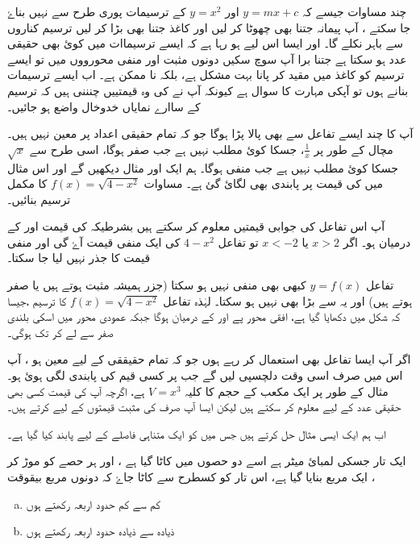 چند مساوات جیسے کہ \( y=mx+c\) اور \(y=x^{2}\) کے ترسیمات پوری طرح سے نہیں بناۓ جا سکتے ، آپ پیمانہ جتنا بھی چھوٹا کر لیں اور کاغذ جتنا بھی بڑا کر لیں ترسیم کناروں سے باہر نکلے گا۔ اور ایسا اس لیے ہو رہا ہے کہ ایسے ترسیماات میں  کوئ بھی حقیقی عدد ہو سکتا ہے جتنا برا آپ سوچ سکیں دونوں مثبت اور منفی محورووں میں تو ایسے ترسیم کو کاغذ میں مقید کر پانا بہت مشکل ہے، بلکہ نا ممکن ہے۔ اب ایسے ترسیمات بنانے ہوں تو آپکی مہارت کا سوال ہے کیونکہ آپ نے  کی وہ قیمتییں چنننی ہیں کہ ترسیم کے ساارے نمایاں خدوخال واضع ہو جائیں۔

آپ کا چند ایسے تفاعل سے بھی پالا پڑا ہوگا جو کہ تمام حقیقی اعداد پر معین نہیں ہیں۔مچال کے طور پر \(\frac{1}{x}\)، جسکا کوئ مطلب نہیں ہے جب   صفر ہوگا، اسی طرح سے \(\sqrt{x}\) جسکا کوئ مطلب نہیں ہے جب  منفی ہوگا۔
 ہم ایک اور مثال دیکھیں گے اور اس مثال میں  کی قیمت پر پابندی بھی لگائ گئ ہے۔
مساوات \(f(x)=\sqrt{4-x^{2}}\) کا مکمل ترسیم بنائیں۔

آپ اس تفاعل کی جوابی قیمتیں معلوم کر سکتے ہیں بشرطیکہ  کی قیمت  اور  کے درمیان ہو۔ اگر  \(x>2 \) یا  \(x<-2 \) تو تفاعل  \(4-x^{2} \) کی ایک منفی قیمت آۓ گی اور منفی قیمت کا جذر نہیں لیا جا سکتا۔

 تفاعل \(y=f(x)\) کبھی بھی منفی نہیں ہو سکتا (جزر ہمیشہ مثبت ہوتے ہیں یا صفر ہوتے ہیں) اور یہ  سے بڑا بھی نہیں ہو سکتا۔ لہٰذہ تفاعل \(f(x)=\sqrt{4-x^{2}}\) کا ترسیم ،جیسا کہ شکل  میں دکھایا گیا ہے، افقی محور پے  اور  کے درمیان ہوگا جبکہ عمودی محور میں اسکی بلندی صفر سے لے کر  تک ہوگی۔

اگر آپ ایسا تفاعل بھی استعمال کر رہے ہوں جو کہ تمام حقیققی  کے لیے معین ہو ، آپ اس میں صرف اسی وقت دلچسپی لیں گے جب  پر کسی قیم کی پابندی لگی ہوئ ہو۔ مثال کے طور پر  ایک مکعب کے حجم کا کلیہ \(V=x^{3}\) ہے، اگرچہ آپ  کی قیمت کسی بھی حقیقی عدد کے لیے معلوم کر سکتے ہیں لیکن ایسا آپ صرف کی مثبت  قیمتوں کے لیے کرتے ہیں۔

اب ہم ایک ایسی مثال حل کرتے ہیں جس میں  کو ایک متناہی فاصلے کے لیے پابند کیا گیا ہے۔
 
 
ایک تار جسکی لمبائ   میٹر ہے اسے دو حصوں میں کاٹا گیا ہے ، اور ہر حصے کو موڑ کر ایک مربع بنایا گیا ہے، اس تار کو کسطرح سے کاٹا جاۓ کہ دونوں مربع بیقوقت ،

\begin{enumerate}[a.]
\item 
کم سے کم حدود اربعہ رکھتے ہوں
\item 
ذیادہ سے ذیادہ حدود اربعہ رکھتے ہوں
\end{enumerate}

